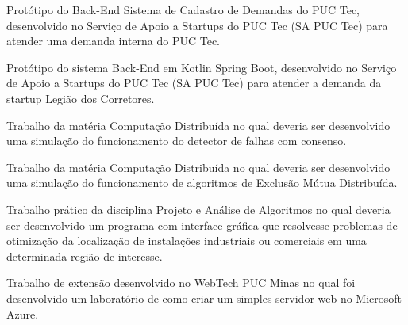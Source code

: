 
Protótipo do Back-End Sistema de Cadastro de Demandas do PUC Tec, desenvolvido no Serviço de Apoio a Startups do PUC Tec (SA PUC Tec) para atender uma demanda interna do PUC Tec.\\
\divider

Protótipo do sistema Back-End em Kotlin Spring Boot, desenvolvido no Serviço de Apoio a Startups do PUC Tec (SA PUC Tec) para atender a demanda da startup Legião dos Corretores.\\
\divider

Trabalho da matéria Computação Distribuída no qual deveria ser desenvolvido uma simulação do funcionamento do detector de falhas com consenso.\\
\divider

Trabalho da matéria Computação Distribuída no qual deveria ser desenvolvido uma simulação do funcionamento de algoritmos de Exclusão Mútua Distribuída.\\
\divider

Trabalho prático da disciplina Projeto e Análise de Algoritmos no qual deveria ser desenvolvido um programa com interface gráfica que resolvesse problemas de otimização da localização de instalações industriais ou comerciais em uma determinada região de interesse.\\
\divider

Trabalho de extensão desenvolvido no WebTech PUC Minas no qual foi desenvolvido um laboratório de como criar um simples servidor web no Microsoft Azure.\\
\divider

